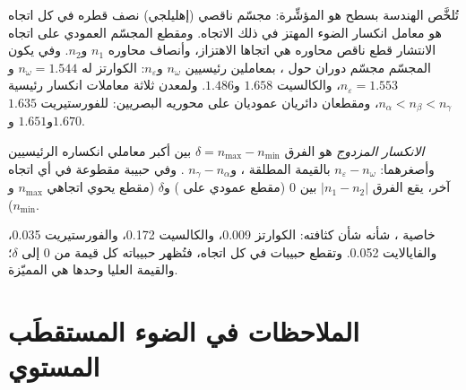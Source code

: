 تُلخَّص الهندسة بسطح هو المؤشِّرة: مجسّم ناقصي (إهليلجي) نصف قطره في كل اتجاه هو معامل انكسار الضوء المهتز في ذلك الاتجاه. ومقطع المجسّم العمودي على اتجاه الانتشار قطع ناقص محاوره هي اتجاها الاهتزاز، وأنصاف محاوره $n_1$ و$n_2$. وفي   يكون المجسّم مجسّم دوران حول ، بمعاملين رئيسيين $n_\omega$ و$n_\varepsilon$: الكوارتز له $n_\omega = 1.544$ و$n_\varepsilon = 1.553$، والكالسيت $1.658$ و$1.486$.
ولمعدن  ثلاثة معاملات انكسار رئيسية $n_\alpha < n_\beta < n_\gamma$، ومقطعان دائريان عموديان على محوريه البصريين: للفورستيريت $1.635$ و$1.651$ و$1.670$.

\begin{definition}\label{def:b1:optical-mineralogy:birefringence}
\emph{الانكسار المزدوج}  هو الفرق $\delta = n_{\max} - n_{\min}$ بين أكبر معاملي انكساره الرئيسيين وأصغرهما: $n_\varepsilon - n_\omega$ بالقيمة المطلقة  ، و$n_\gamma - n_\alpha$  . وفي حبيبة مقطوعة في أي اتجاه آخر، يقع الفرق $|n_1 - n_2|$ بين 0 (مقطع عمودي على ) و$\delta$ (مقطع يحوي اتجاهي $n_{\max}$ و$n_{\min}$).
\end{definition}

 خاصية ، شأنه شأن كثافته: الكوارتز \num{0.009}، والكالسيت \num{0.172}، والفورستيريت \num{0.035}، والفايالايت \num{0.052}. وتقطع  حبيبات  في كل اتجاه، فتُظهر حبيباته كل قيمة من 0 إلى $\delta$؛ والقيمة العليا وحدها هي المميّزة.

\section{الملاحظات في الضوء المستقطَب المستوي}

